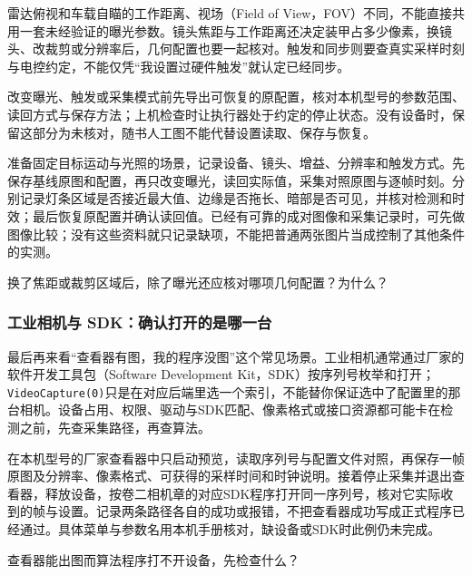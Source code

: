 雷达俯视和车载自瞄的工作距离、视场（Field of View，FOV）不同，不能直接共用一套未经验证的曝光参数。镜头焦距与工作距离还决定装甲占多少像素，换镜头、改裁剪或分辨率后，几何配置也要一起核对。触发和同步则要查真实采样时刻与电控约定，不能仅凭“我设置过硬件触发”就认定已经同步。

\begin{note}
改变曝光、触发或采集模式前先导出可恢复的原配置，核对本机型号的参数范围、读回方式与保存方法；上机检查时让执行器处于约定的停止状态。没有设备时，保留这部分为未核对，随书人工图不能代替设置读取、保存与恢复。
\end{note}

\begin{example}
准备固定目标运动与光照的场景，记录设备、镜头、增益、分辨率和触发方式。先保存基线原图和配置，再只改变曝光，读回实际值，采集对照原图与逐帧时刻。分别记录灯条区域是否接近最大值、边缘是否拖长、暗部是否可见，并核对检测和时效；最后恢复原配置并确认读回值。已经有可靠的成对图像和采集记录时，可先做图像比较；没有这些资料就只记录缺项，不能把普通两张图片当成控制了其他条件的实测。
\end{example}

\begin{exercise}
\label{v3-ex-camera-4}
换了焦距或裁剪区域后，除了曝光还应核对哪项几何配置？为什么？
\end{exercise}

\subsubsection{工业相机与 SDK：确认打开的是哪一台}

最后再来看“查看器有图，我的程序没图”这个常见场景。工业相机通常通过厂家的软件开发工具包（Software Development Kit，SDK）按序列号枚举和打开；\texttt{VideoCapture(0)}只是在对应后端里选一个索引，不能替你保证选中了配置里的那台相机。设备占用、权限、驱动与SDK匹配、像素格式或接口资源都可能卡在检测之前，先查采集路径，再查算法。

\begin{example}[把查看器和正式程序分别核对]
在本机型号的厂家查看器中只启动预览，读取序列号与配置文件对照，再保存一帧原图及分辨率、像素格式、可获得的采样时间和时钟说明。接着停止采集并退出查看器，释放设备，按卷二相机章的对应SDK程序打开同一序列号，核对它实际收到的帧与设置。记录两条路径各自的成功或报错，不把查看器成功写成正式程序已经通过。具体菜单与参数名用本机手册核对，缺设备或SDK时此例仍未完成。
\end{example}

\begin{exercise}
\label{v3-ex-camera-5}
查看器能出图而算法程序打不开设备，先检查什么？
\end{exercise}
